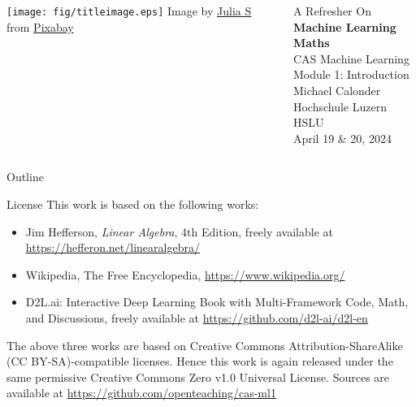 \documentclass[9pt,aspectratio=169,xcolor=dvipsnames]{beamer}
\begin{document}
\begin{frame}
    \begin{columns}[onlytextwidth]
        \begin{column}{0.4\textwidth}
            \vspace*{10mm}
            \texttt{[image: fig/titleimage.eps]}
            {\tiny Image by \href{https://pixabay.com/users/julia_s-4109630/}{Julia S} from
                \href{https://pixabay.com}{Pixabay}}
        \end{column}
        \begin{column}{0.6\textwidth}
            \flushright
            {A Refresher On}\\[1mm]
            {\Huge \textbf{Machine Learning Maths}}\\[15mm]
            {\Large CAS Machine Learning}\\[1mm]
            {\Large Module 1: Introduction}\\[15mm]
            Michael Calonder\\[1mm]
            Hochschule Luzern HSLU\\[1mm]
            {April 19 \& 20, 2024}\\
        \end{column}
    \end{columns}
\end{frame}

\begin{frame}{Outline}
    \tableofcontents
\end{frame}






% 
% 

\begin{frame}{License}
    \small
    This work is based on the following works:
    \begin{itemize}
        \item Jim Hefferson, \emph{Linear Algebra}, 4th Edition, freely available at \url{https://hefferon.net/linearalgebra/}
        \item Wikipedia, The Free Encyclopedia, \url{https://www.wikipedia.org/}
        \item D2L.ai: Interactive Deep Learning Book with Multi-Framework Code, Math, and Discussions, freely available at \url{https://github.com/d2l-ai/d2l-en}
    \end{itemize}

    The above three works are based on Creative Commons Attribution-ShareAlike (CC BY-SA)-compatible licenses. Hence this work is again released under
    the same permissive Creative Commons Zero v1.0 Universal License. Sources are available at \url{https://github.com/openteaching/cas-ml1}
\end{frame}
\end{document}
